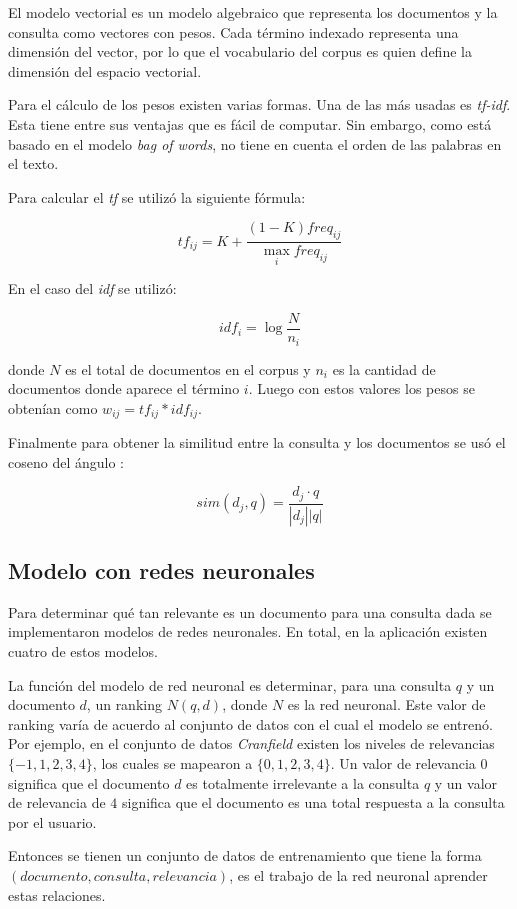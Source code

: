 \documentclass[12pt]{article}
\begin{document}
El modelo vectorial\cite{vectormodel} es un modelo algebraico que representa los documentos
y la consulta como vectores con pesos. Cada término indexado representa
una dimensión del vector, por lo que el vocabulario del corpus es
quien define la dimensión del espacio vectorial.

Para el cálculo de los pesos existen varias formas. Una de las más 
usadas es \textit{tf-idf}. Esta tiene entre sus ventajas que es 
fácil de computar. Sin embargo, como está basado en el modelo
\textit{bag of words}, no tiene en cuenta el orden de las palabras
en el texto.

Para calcular el \textit{tf} se utilizó la siguiente fórmula:

$$tf_{ij} = K + \frac{(1-K)freq_{ij}}{\max_{i} freq_{ij}}$$

En el caso del \textit{idf} se utilizó:

$$idf_i= \log \frac{N}{n_i}$$

donde $N$ es el total de documentos en el corpus y $n_i$ es la
cantidad de documentos donde aparece el término $i$. Luego con estos 
valores los pesos se obtenían como $w_{ij}= tf_{ij}*idf_{ij}$.

Finalmente para obtener la similitud entre la consulta y los 
documentos se usó el coseno del ángulo :

$$sim(d_{j},q) = \frac{ d_{j} \cdot q }{ |d_{j}||q| }$$


\subsection{Modelo con redes neuronales}

Para determinar qué tan relevante es un documento para una consulta dada se implementaron modelos de redes neuronales. En total, en la aplicación existen cuatro de estos modelos. 

La función del modelo de red neuronal es determinar, para una consulta $q$ y un documento $d$, un ranking $N(q,d)$, donde $N$ es la red neuronal. Este valor de ranking varía de acuerdo al conjunto de datos con el cual el modelo se entrenó. Por ejemplo, en el conjunto de datos \textit{Cranfield} existen los niveles de relevancias $\{-1,1,2,3,4\}$, los cuales se mapearon a $\{0,1,2,3,4\}$. Un valor de relevancia $0$ significa que el documento $d$ es totalmente irrelevante a la consulta $q$ y un valor de relevancia de $4$ significa que el documento es una total respuesta a la consulta por el usuario.

Entonces se tienen un conjunto de datos de entrenamiento que tiene la forma $(documento, consulta, relevancia)$, es el trabajo de la red neuronal aprender estas relaciones.
\end{document}
